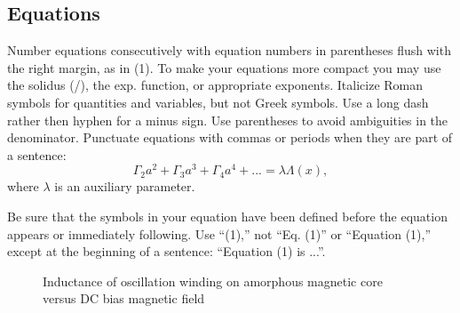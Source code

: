 \documentclass[letterpaper, 10 pt, conference]{ieeeconf}  %
\begin{document}
\subsection{Equations}

Number equations consecutively with equation numbers in parentheses flush
 with the right margin, as in (1). To make your equations more compact
 you may use the solidus (/), the exp. function, or appropriate exponents.
  Italicize Roman symbols for quantities and variables, but not Greek symbols.
   Use a long dash rather then hyphen for a minus sign. Use parentheses to avoid
    ambiguities in the denominator.
Punctuate equations with commas or periods when they are part of a sentence:
$$\Gamma_2 a^2 + \Gamma_3 a^3 + \Gamma_4 a^4 + ... = \lambda \Lambda(x),$$
where $\lambda$ is an auxiliary parameter.

Be sure that the symbols in your equation have been defined before the
equation appears or immediately following.
Use ``(1),'' not ``Eq. (1)'' or ``Equation (1),''
except at the beginning of a sentence: ``Equation (1) is ...''.


   \begin{figure}[thpb]
      \centering
      \caption{Inductance of oscillation winding on amorphous
       magnetic core versus DC bias magnetic field}
      \label{figurelabel}
   \end{figure}
\end{document}
